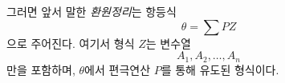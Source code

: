 
그러면 앞서 말한 \emph{환원정리}는 항등식
\begin{equation}
  \theta=\sum PZ
\tag{1}
\end{equation}
으로 주어진다. 여기서 형식 $Z$는 변수열
\[
  A_1,A_2,\ldots,A_n
\]
만을 포함하며, $\theta$에서 편극연산 $P$를 통해 유도된 형식이다.
